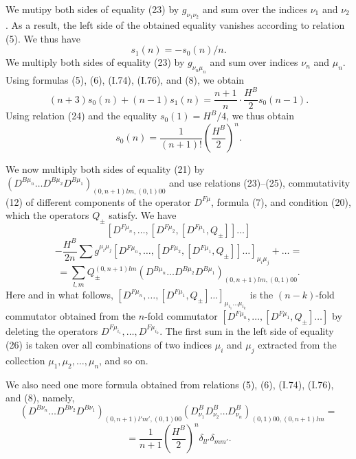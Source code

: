 \documentclass[a4paper,12pt]{article}
\begin{document}
We mutipy both sides of equality (23) by $g_{\nu_{1}\nu_{2}}$ and sum over the
indices $\nu_{1}$ and $\nu_{2}$. As a result, the left side of the obtained
equality vanishes according to relation (5). We thus have
\begin{equation}
s_{1}(n) = - s_{0}(n)/n.
\end{equation}
We multiply both sides of equality (23) by $g_{\nu_{n}\mu_{n}}$ and sum over
indices $\nu_{n}$ and $\mu_{n}$. Using formulas (5), (6), (I.74), (I.76), and
(8), we obtain
$$(n+3)s_{0}(n) + (n-1)s_{1}(n)=\frac{n+1}{n} \cdot \frac{H^{B}}{2} 
s_{0}(n-1).$$
Using relation (24) and the equality $s_{0}(1)=H^{B}/4$, we thus obtain
\begin{equation}
s_{0}(n)= \frac{1}{(n+1)!} \left( \frac{H^{B}}{2} \right)^{n}.
\end{equation}

We now multiply both sides of equality (21) by $(D^{B\mu_{n}} \ldots 
D^{B\mu_{2}}D^{B\mu_{1}})_{(0,n+1)lm,(0,1)00}$ and use relations (23)--(25),
commutativity (12) of different components of the operator $D^{F\mu}$, formula
(7), and condition (20), which the operators $Q_{\pm}$ satisfy. We have
$$[D^{F \mu_{n}}, \ldots, [D^{F \mu_{2}},[ D^{F \mu_{1}},Q_{\pm}]] \ldots ]$$
$$- \frac{H^{B}}{2n} \sum g^{\mu_{i} \mu_{j}}
[D^{F \mu_{n}}, \ldots, [D^{F \mu_{2}},[ D^{F \mu_{1}},Q_{\pm}]] \ldots 
]_{\mu_{i}\mu_{j}}+\ldots =$$
\begin{equation}
= \sum_{l,m} Q^{(0,n+1)lm}_{\pm}\left( D^{B\mu_{n}} \ldots D^{B\mu_{2}} 
D^{B\mu_{1}}\right)_{(0,n+1)lm,(0,1)00}.
\end{equation}
Here and in what follows, $[D^{F \mu_{n}}, \ldots, [D^{F \mu_{1}},Q_{\pm}] 
\ldots ]_{\mu_{i_{1}} \ldots \mu_{i_{k}}}$ is the $(n-k)$-fold commutator
obtained from the $n$-fold commutator $[D^{F \mu_{n}}, \ldots, [D^{F \mu_{1}},
Q_{\pm}] \ldots ]$ by deleting the operators $ D^{F \mu_{i_{1}}}, \ldots, 
D^{F \mu_{i_{k}}}$. The first sum in the left side of equality (26) is taken
over all combinations of two indices $\mu_{i}$ and $\mu_{j}$ extracted from the
collection $\mu_{1}, \mu_{2}, \ldots , \mu_{n}$, and so on.

We also need one more formula obtained from relations (5), (6), (I.74), (I.76),
and (8), namely,
$$(D^{B\nu_{n}} \ldots D^{B\nu_{2}}D^{B\nu_{1}})_{(0,n+1)l'm',(0,1)00}
(D^{B}_{\nu_{1}}D^{B}_{\nu_{2}}\ldots D^{B}_{\nu_{n}})_{(0,1)00,(0,n+1)lm}=$$
\begin{equation}
=\frac{1}{n+1} \left( \frac{H^{B}}{2} \right)^{n} \delta_{l l'} \delta_{m m'}.
\end{equation}
\end{document}
